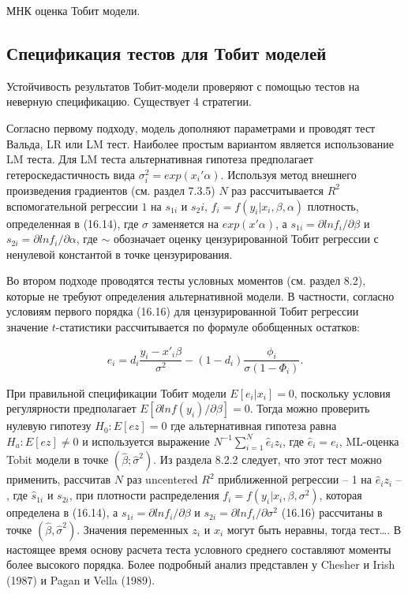 МНК оценка Тобит модели.


\subsection{Спецификация тестов для Тобит моделей}


Устойчивость результатов Тобит-модели проверяют с помощью тестов на неверную спецификацию. Существует 4 стратегии.

Согласно первому подходу, модель дополняют параметрами и проводят тест Вальда, LR или LM тест. Наиболее простым вариантом является использование LM теста. Для LM теста альтернативная гипотеза предполагает гетероскедастичность вида $\sigma_i^2=exp(x_i'\alpha)$. Используя метод внешнего произведения градиентов (см. раздел 7.3.5) $N$ раз рассчитывается $R^2$ вспомогательной регрессии $1$ на $s_{1i}$ и $s_2i$, $f_i=f(y_i|x_i,\beta,\alpha)$ плотность, определенная в (16.14), где $\sigma$ заменяется на $exp(x'\alpha)$, а $s_{1i}=\partial ln f_i/\partial\beta$ и $s_{2i}=\partial ln f_{i}/\partial \alpha$, где $\sim$ обозначает оценку цензурированной Тобит регрессии с ненулевой константой в точке цензурирования. 


Во втором подходе проводятся тесты условных моментов (см. раздел 8.2), которые не требуют определения альтернативной модели. В частности, согласно условиям первого порядка (16.16) для цензурированной Тобит регрессии значение $t$-статистики рассчитывается по формуле обобщенных остатков: 

\[
e_i=d_i\dfrac{y_i-x'_i\beta}{\sigma^2}-(1-d_i)\dfrac{\phi_i}{\sigma(1-\Phi_i)}.
\]

При правильной спецификации Тобит модели $E[e_i|x_i]=0$, поскольку условия регулярности предполагает $E[\partial{ln{f(y_i)}}/\partial\beta]=0$. Тогда можно проверить нулевую гипотезу $H_0:E[ez]=0$ где альтернативная гипотеза равна $H_a:E[ez]{\neq}0$ и используется выражение $N^{-1}\sum_{i=1}^N{\hat{e}_iz_i}$, где $\hat{e}_i=e_i$, ML-оценка Tobit модели в точке $(\hat{\beta};\hat{\sigma}^2)$. Из раздела 8.2.2 следует, что этот тест можно применить, рассчитав $N$ раз uncentered $R^2$ приближенной регрессии -- 1 на $\hat{e}_iz_i$ -- , где $\hat{s}_{1i}$ и $s_{2i}$, при плотности распределения $f_{i}=f(y_{i}|x_{i},\beta,\sigma^2)$, которая определена в (16.14), а $s_{1i}=\partial{ln}f_{i}/\partial\beta$ и $s_{2i}=\partial{ln}f_{i}/\partial\sigma^2$ (16.16) рассчитаны в точке $(\hat{\beta},\hat{\sigma}^2)$. Значения переменных $z_i$ и $x_i$ могут быть неравны, тогда тест\ldots . В настоящее время основу расчета теста условного среднего составляют моменты более высокого порядка. Более подробный анализ представлен у Chesher и Irish (1987) и Pagan и Vella (1989). 

